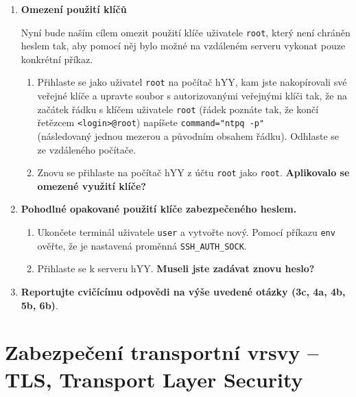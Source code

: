\documentclass[a4paper,11pt]{article}
\begin{document}
\begin{enumerate}
  \item {\bf Omezení použití klíčů}

    Nyní bude naším cílem omezit použití klíče uživatele {\tt root}, který není chráněn heslem tak,
    aby pomocí něj bylo možné na vzdáleném serveru vykonat pouze konkrétní příkaz.

    \begin{enumerate}

      \item Přihlaste se jako uživatel {\tt root} na počítač hYY, kam jste nakopírovali své veřejné klíče a
        upravte soubor s autorizovanými veřejnými klíči tak, že na začátek
        řádku s klíčem uživatele {\tt root} (řádek poznáte tak, že končí řetězcem
        {\tt <login>@root}) napíšete
        \verb|command="ntpq -p" | \\ (následovaný jednou mezerou a původním
        obsahem řádku).
        Odhlaste se ze vzdáleného počítače.

      \item Znovu se přihlaste na počítač hYY z
        účtu {\tt root} jako {\tt root}.  {\bf Aplikovalo se
        omezené využití klíče?}

    \end{enumerate}


  \item {\bf Pohodlné opakované použití klíče zabezpečeného heslem.}

    \begin{enumerate}

      \item Ukončete terminál uživatele {\tt user} a vytvořte nový. Pomocí
        příkazu \verb|env| ověřte, že je nastavená proměnná
        \verb|SSH_AUTH_SOCK|.

      \item Přihlaste se k serveru hYY. {\bf Museli jste zadávat znovu heslo?}

    \end{enumerate}
  \item {\bf Reportujte cvičícímu odpovědi na výše uvedené otázky (3c, 4a, 4b,
    5b, 6b)}.

\end{enumerate}

\section{Zabezpečení transportní vrsvy -- TLS, Transport Layer Security}
\end{document}
